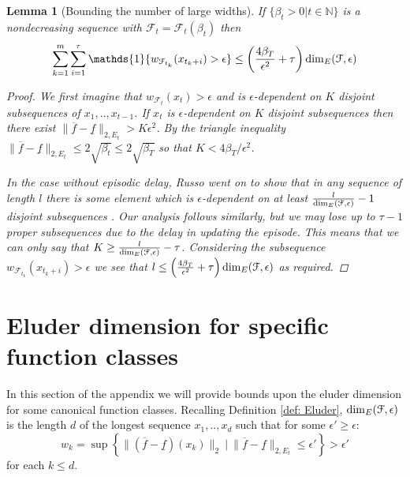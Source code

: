 \documentclass{article}
\newtheorem{lemma2}{Lemma}
\newcommand{\Nat}{\mathbb{N}}
\newcommand{\Ind}{\mathds{1}}
\newcommand{\Fc}{\mathcal{F}}
\begin{document}
\begin{lemma2}[Bounding the number of large widths]
\hspace{0.00000000000001mm} \newline
If $\{ \beta_t >0 \big| t \in \Nat \}$ is a nondecreasing sequence with $\Fc_t = \Fc_t(\beta_t)$ then
$$ \sum_{k=1}^m \sum_{i=1}^\tau \Ind \{w_{\Fc_{t_k}}(x_{t_k+i}) > \epsilon \} \le
	\left( \frac{4\beta_T}{\epsilon^2}+ \tau \right) {\rm dim}_E(\Fc,\epsilon) $$

\begin{proof}
We first imagine that $w_{\Fc_t}(x_t) > \epsilon$ and is $\epsilon$-dependent on $K$ disjoint subsequences of $x_1,..,x_{t-1}$.
If $x_t$ is $\epsilon$-dependent on $K$ disjoint subsequences then there exist $\|\overline{f} - \underline{f} \|_{2,E_t} > K \epsilon^2$. By the triangle inequality $\|\overline{f} - \underline{f} \|_{2,E_t} \le 2\sqrt{\beta_t} \le 2\sqrt{\beta_T}$ so that $K < 4\beta_T / \epsilon^2$.

In the case without episodic delay, Russo went on to show that in any sequence of length $l$ there is some element which is $\epsilon$-dependent on at least $\frac{l}{{\rm dim}_E(\Fc,\epsilon)}-1$ disjoint subsequences \cite{russo2013}.
Our analysis follows similarly, but we may lose up to $\tau-1$ proper subsequences due to the delay in updating the episode.
This means that we can only say that $K \ge \frac{l}{{\rm dim}_E(\Fc,\epsilon)}-\tau$.
Considering the subsequence $w_{\Fc_{t_k}}(x_{t_k+i}) > \epsilon$ we see that $l \le \left( \frac{4\beta_T}{\epsilon^2}+ \tau \right) {\rm dim}_E(\Fc,\epsilon)$ as required.
\end{proof}
\end{lemma2}

\section{Eluder dimension for specific function classes}
\label{app: eluder dims}
In this section of the appendix we will provide bounds upon the eluder dimension for some canonical function classes.
Recalling Definition \ref{def: Eluder}, ${\rm dim}_E(\Fc,\epsilon)$ is the length $d$ of the longest sequence $x_1,..,x_d$ such that for some $\epsilon' \ge \epsilon$:
\begin{equation}
\label{eq: w_k}
	w_k = \sup \left\{ \|(\overline{f} - \underline{f}) (x_k)\|_2 \ \bigg| \  \|\overline{f}-\underline{f}\|_{2,E_t} \le \epsilon' \right\}
	> \epsilon'
\end{equation}
for each $k\le d$.
\end{document}
